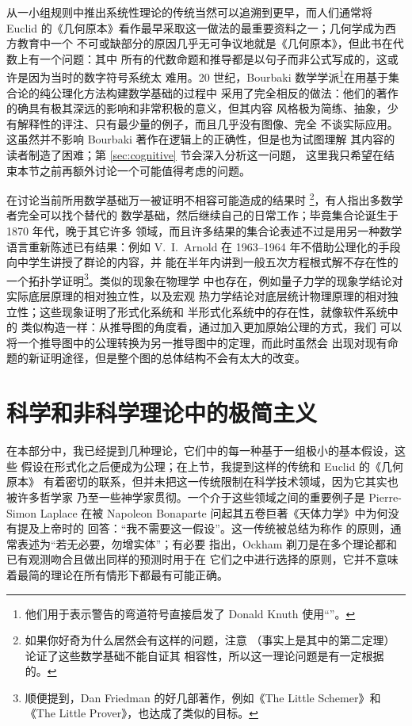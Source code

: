 从一小组规则中推出系统性理论的传统当然可以追溯到更早，而人们通常将 Euclid
的《几何原本》看作最早采取这一做法的最重要资料之一；几何学成为西方教育中一个
不可或缺部分的原因几乎无可争议地就是《几何原本》，但此书在代数上有一个问题：其中
所有的代数命题和推导都是以句子而非公式写成的，这或许是因为当时的数字符号系统太
难用。20 世纪，Bourbaki 数学学派\footnote{他们用于表示警告的弯道符号直接启发了
Donald Knuth 使用“\textdbend”。}在用基于集合论的纯公理化方法构建数学基础的过程中
采用了完全相反的做法：他们的著作的确具有极其深远的影响和非常积极的意义，但其内容
风格极为简练、抽象，少有解释性的评注、只有最少量的例子，而且几乎没有图像、完全
不谈实际应用。这虽然并不影响 Bourbaki 著作在逻辑上的正确性，但是也为试图理解
其内容的读者制造了困难；第 \ref{sec:cognitive} 节会深入分析这一问题，
这里我只希望在结束本节之前再额外讨论一个可能值得考虑的问题。

在讨论当前所用数学基础万一被证明不相容可能造成的结果时%
\footnote{如果你好奇为什么居然会有这样的问题，注意 %
（事实上是其中的第二定理）论证了这些数学基础不能自证其
相容性，所以这一理论问题是有一定根据的。}，有人指出多数学者完全可以找个替代的
数学基础，然后继续自己的日常工作；毕竟集合论诞生于 1870 年代，晚于其它许多
领域，而且许多结果的集合论表述不过是用另一种数学语言重新陈述已有结果：例如
V.~I.\ Arnold 在 1963--1964 年不借助公理化的手段向中学生讲授了群论的内容，并
能在半年内讲到一般五次方程根式解不存在性的一个拓扑学证明\footnote{顺便提到，Dan Friedman 的好几部著作，例如《The Little
Schemer》和《The Little Prover》，也达成了类似的目标。}。类似的现象在物理学
中也存在，例如量子力学的现象学结论对实际底层原理的相对独立性，以及宏观
热力学结论对底层统计物理原理的相对独立性；这些现象证明了形式化系统和
半形式化系统中的存在性，就像软件系统中的
类似构造一样：从推导图的角度看，通过加入更加原始公理的方式，我们
可以将一个推导图中的公理转换为另一推导图中的定理，而此时虽然会
出现对现有命题的新证明途径，但是整个图的总体结构不会有太大的改变。

\section{科学和非科学理论中的极简主义}\label{sec:ockham}

在本部分中，我已经提到几种理论，它们中的每一种基于一组极小的基本假设，这些
假设在形式化之后便成为公理；在上节，我提到这样的传统和 Euclid 的《几何原本》
有着密切的联系，但并未把这一传统限制在科学技术领域，因为它其实也被许多哲学家
乃至一些神学家贯彻。一个介于这些领域之间的重要例子是 Pierre-Simon Laplace
在被 Napoleon Bonaparte 问起其五卷巨著《天体力学》中为何没有提及上帝时的
回答：“我不需要这一假设”。这一传统被总结为称作 %
的原则，通常表述为“若无必要，勿增实体”；有必要
指出，Ockham 剃刀是在多个理论都和已有观测吻合且做出同样的预测时用于在
它们之中进行选择的原则，它并不意味着最简的理论在所有情形下都最有可能正确。


